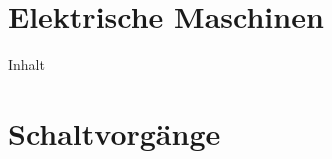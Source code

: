 \documentclass[twoside, a4paper]{article}
\begin{document}
\cleardoublepage
\part{Elektrische Maschinen}
{Inhalt}

\cleardoublepage
\part{Schaltvorgänge}


\cleardoublepage
\appendix
\setheadanhang

%

%

\clearpage
{}
\printbibliography

\clearpage
{}
\printindex
\end{document}
